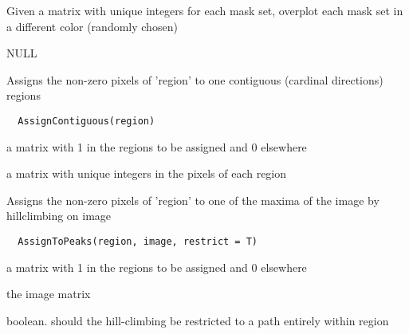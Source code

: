 \documentclass[a4paper]{book}
\begin{document}
%
\begin{Details}\relax
Given a matrix with unique integers for each mask set,
overplot each mask set in a different color (randomly
chosen)
\end{Details}
%
\begin{Value}
NULL
\end{Value}
%
\begin{Description}\relax
Assigns the non-zero pixels of 'region' to one contiguous
(cardinal directions) regions
\end{Description}
%
\begin{Usage}
\begin{verbatim}
  AssignContiguous(region)
\end{verbatim}
\end{Usage}
%
\begin{Arguments}
\begin{ldescription}
\item[\code{region}] a matrix with 1 in the regions to be
assigned and 0 elsewhere
\end{ldescription}
\end{Arguments}
%
\begin{Value}
a matrix with unique integers in the pixels of each
region
\end{Value}
%
\begin{Description}\relax
Assigns the non-zero pixels of 'region' to one of the
maxima of the image by hillclimbing on image
\end{Description}
%
\begin{Usage}
\begin{verbatim}
  AssignToPeaks(region, image, restrict = T)
\end{verbatim}
\end{Usage}
%
\begin{Arguments}
\begin{ldescription}
\item[\code{region}] a matrix with 1 in the regions to be
assigned and 0 elsewhere

\item[\code{image}] the image matrix

\item[\code{restrict}] boolean.  should the hill-climbing be
restricted to a path entirely within region
\end{ldescription}
\end{Arguments}
\end{document}
